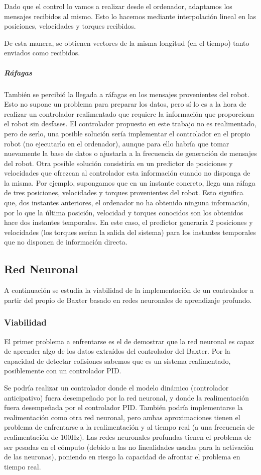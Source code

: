 Dado que el control lo vamos a realizar desde el ordenador, adaptamos los mensajes recibidos al mismo. Esto lo hacemos mediante interpolación lineal en las posiciones, velocidades y torques recibidos.

De esta manera, se obtienen vectores de la misma longitud (en el tiempo) tanto enviados como recibidos.

\subparagraph{Ráfagas}
También se percibió la llegada a ráfagas en los mensajes provenientes del robot. Esto no supone un problema para preparar los datos, pero sí lo es a la hora de realizar un controlador realimentado que requiere la información que proporciona el robot sin desfases. El controlador propuesto en este trabajo no es realimentado, pero de serlo, una posible solución sería implementar el controlador en el propio robot (no ejecutarlo en el ordenador), aunque para ello habría que tomar nuevamente la base de datos o ajustarla a la frecuencia de generación de mensajes del robot. Otra posible solución consistiría en un predictor de posiciones y velocidades que ofrezcan al controlador esta información cuando no disponga de la misma. Por ejemplo, supongamos que en un instante concreto, llega una ráfaga de tres posiciones, velocidades y torques provenientes del robot. Esto significa que, dos instantes anteriores, el ordenador no ha obtenido ninguna información, por lo que la última posición, velocidad y torques conocidos son los obtenidos hace dos instantes temporales. En este caso, el predictor generaría 2 posiciones y velocidades (los torques serían la salida del sistema) para los instantes temporales que no disponen de información directa.


\subsection{Red Neuronal}
A continuación se estudia la viabilidad de la implementación de un controlador a partir del propio de Baxter basado en redes neuronales de aprendizaje profundo.
\subsubsection{Viabilidad}
El primer problema a enfrentarse es el de demostrar que la red neuronal es capaz de aprender algo de los datos extraídos del controlador del Baxter. Por la capacidad de detectar colisiones sabemos que es un sistema realimentado, posiblemente con un controlador PID.

Se podría realizar un controlador donde el modelo dinámico (controlador anticipativo) fuera desempeñado por la red neuronal, y donde la realimentación fuera desempeñada por el controlador PID. También podría implementarse la realimentación como otra red neuronal, pero ambas aproximaciones tienen el problema de enfrentarse a la realimentación y al tiempo real (a una frecuencia de realimentación de 100Hz). Las redes neuronales profundas tienen el problema de ser pesadas en el cómputo (debido a las no linealidades usadas para la activación de las neuronas), poniendo en riesgo la capacidad de afrontar el problema en tiempo real.

